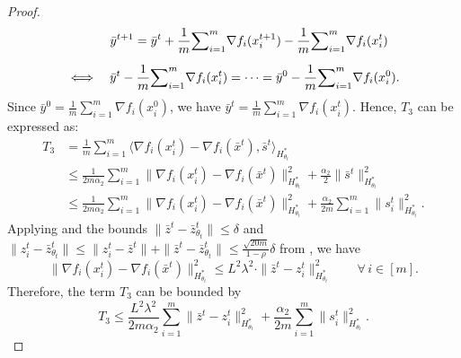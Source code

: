 \documentclass{article}
\theoremstyle{plain}
\theoremstyle{definition}
\theoremstyle{remark}
\newcommand{\sL}{L}
\begin{document}
\begin{proof}
    \begin{equation*} \begin{aligned}
        &\hspace{1.2cm}\bar y^{t+1} = \bar y^t + \frac{1}{m}{\sum}_{i=1}^m \nabla f_i(x_i^{t+1}) - \frac{1}{m}{\sum}_{i=1}^m \nabla f_i(x_i^{t}) \\[2mm]
        &\Longleftrightarrow \quad \bar y^t - \frac{1}{m}{\sum}_{i=1}^m \nabla f_i(x_i^{t}) = \cdots = \bar y^0 - \frac{1}{m}{\sum}_{i=1}^m \nabla f_i(x_i^{0}).
    \end{aligned} \end{equation*}
    Since $\bar y^0 = \frac{1}{m}{\sum}_{i=1}^m \nabla f_i(x_i^{0})$, we have $\bar
    y^t = \frac{1}{m}{\sum}_{i=1}^m \nabla f_i(x_i^{t})$. Hence, $T_3$ can be expressed as:
    \begin{equation*} \begin{aligned}
        T_3 &= \frac{1}{m} {\sum}_{i=1}^m \langle \nabla f_i(x_i^t) - \nabla f_i(\bar x^t), \bar s^t \rangle_{H_{\theta_t}^*}\\
        &\leq \frac{1}{2m\alpha_2} {\sum}_{i=1}^m \|\nabla f_i(x_i^t) - \nabla f_i(\bar x^t)\|_{H_{\theta_t}^*}^2 + \frac{\alpha_2}{2}\|\bar s^t\|_{H_{\theta_t}^*}^2\\
        &\leq \frac{1}{2m\alpha_2} {\sum}_{i=1}^m \|\nabla f_i(x_i^t) - \nabla f_i(\bar x^t)\|_{H_{\theta_t}^*}^2 + \frac{\alpha_2}{2m} {\sum}_{i=1}^m\|s^t_i\|_{H_{\theta_t}^*}^2.
    \end{aligned} \end{equation*}
    Applying  and the bounds $\|\bar z^t-\bar z_{\theta_t}^t\|\leq\delta$ and $\|z_i^t-\bar z_{\theta_t}^t\|\leq\|z_i^t-\bar z^t\|+\|\bar z^t-\bar z_{\theta_t}^t\|\leq\frac{\sqrt{20m}}{1-\rho}\delta$ from , we have %
    \begin{equation*} 
        \|\nabla f_i(x_i^t) - \nabla f_i(\bar x^t)\|_{H_{\theta_t}^*}^2 %
        \leq \sL^2 \lambda^2 \cdot  \|\bar z^t - z_i^t\|_{H_{\theta_t}^*}^2\qquad 
    \forall\, i\in[m].
    \end{equation*} 
    Therefore, the term $T_3$ can be bounded by
    \begin{equation}
        \label{eq:bound T3}
    T_3 \leq \frac{\sL^2\lambda^2}{2m\alpha_2} {\sum}_{i=1}^m \|\bar z^t - z_i^t\|_{H_{\theta_t}^*}^2 + \frac{\alpha_2}{2m} {\sum}_{i=1}^m\|s^t_i\|_{H_{\theta_t}^*}^2.

\end{equation}
\end{proof}
\end{document}
